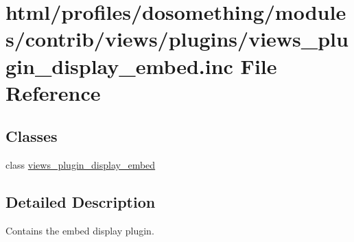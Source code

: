 \hypertarget{views__plugin__display__embed_8inc}{
\section{html/profiles/dosomething/modules/contrib/views/plugins/views\_\-plugin\_\-display\_\-embed.inc File Reference}
\label{views__plugin__display__embed_8inc}
}
\subsection*{Classes}
\begin{DoxyCompactItemize}
\item 
class \hyperlink{classviews__plugin__display__embed}{views\_\-plugin\_\-display\_\-embed}
\end{DoxyCompactItemize}


\subsection{Detailed Description}
Contains the embed display plugin. 